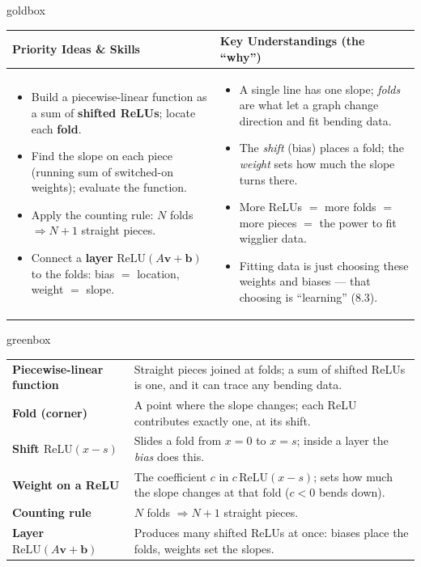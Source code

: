 \documentclass[10pt]{article}
\newcommand{\vv}{\mathbf{v}}
\newcommand{\bb}{\mathbf{b}}
\newcommand{\relu}{\mathrm{ReLU}}
\begin{document}
\renewcommand{\arraystretch}{1.4}
\begin{skillbox}{goldbox}
\begin{tabularx}{\linewidth}{@{}X|X@{}}
\textbf{Priority Ideas \& Skills} & \textbf{Key Understandings (the ``why'')} \\[2pt]
\hline
\vspace{-6pt}
\begin{itemize}[leftmargin=1.1em, nosep, after=\vspace{2pt}]
  \item Build a piecewise-linear function as a sum of \textbf{shifted ReLUs}; locate each \textbf{fold}.
  \item Find the slope on each piece (running sum of switched-on weights); evaluate the function.
  \item Apply the counting rule: $N$ folds $\Rightarrow N+1$ straight pieces.
  \item Connect a \textbf{layer} $\relu(A\vv+\bb)$ to the folds: bias $=$ location, weight $=$ slope.
\end{itemize}
&
\vspace{-6pt}
\begin{itemize}[leftmargin=1.1em, nosep, after=\vspace{2pt}]
  \item A single line has one slope; \emph{folds} are what let a graph change direction and fit bending data.
  \item The \emph{shift} (bias) places a fold; the \emph{weight} sets how much the slope turns there.
  \item More ReLUs $=$ more folds $=$ more pieces $=$ the power to fit wigglier data.
  \item Fitting data is just choosing these weights and biases --- that choosing is ``learning'' (8.3).
\end{itemize}
\end{tabularx}
\end{skillbox}

\begin{skillbox}{greenbox}
\renewcommand{\arraystretch}{1.3}
\begin{tabularx}{\linewidth}{@{}l X@{}}
\textbf{Piecewise-linear function} & Straight pieces joined at folds; a sum of shifted ReLUs is one, and it can trace any bending data. \\
\textbf{Fold (corner)} & A point where the slope changes; each ReLU contributes exactly one, at its shift. \\
\textbf{Shift $\relu(x-s)$} & Slides a fold from $x=0$ to $x=s$; inside a layer the \emph{bias} does this. \\
\textbf{Weight on a ReLU} & The coefficient $c$ in $c\,\relu(x-s)$; sets how much the slope changes at that fold ($c<0$ bends down). \\
\textbf{Counting rule} & $N$ folds $\Rightarrow N+1$ straight pieces. \\
\textbf{Layer $\relu(A\vv+\bb)$} & Produces many shifted ReLUs at once: biases place the folds, weights set the slopes. \\
\end{tabularx}
\end{skillbox}
\end{document}
